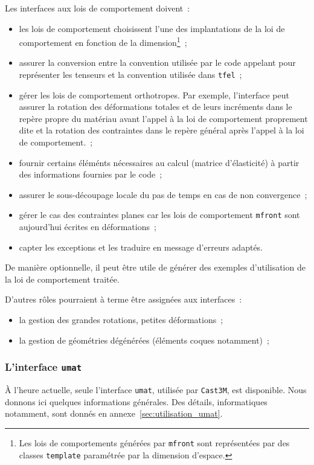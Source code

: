 \documentclass[rectoverso,pleiades,pstricks,leqno,anti]{texmf/note_technique_2010}
\newcommand{\TFEL}{\texttt{tfel}}
\newcommand{\mfront}{\texttt{mfront}}
\newcommand{\castem}{\texttt{Cast3M}}
\def\ifmonospace{\ifdim\fontdimen3\font=0pt }
\def\cpp{%
\ifmonospace%
    C++%
\else%
    C\kern-.1667em\raise.30ex\hbox{\smaller{++}}%
\fi%
\spacefactor1000 }
\begin{document}
Les interfaces aux lois de comportement doivent~:
\begin{itemize}
  \item les lois de comportement choisissent l'une des implantations de
  la loi de comportement en fonction de la dimension\footnote{Les lois
    de comportements générées par \mfront{} sont représentées par des
    classes \texttt{template} paramétrée par la dimension d'espace.}~;
  \item assurer la conversion entre la convention utilisée par le code
  appelant pour représenter les tenseurs et la convention utilisée dans
  \TFEL{}~;
  \item gérer les lois de comportement orthotropes. Par exemple,
  l'interface peut assurer la rotation des déformations totales et de
  leurs incréments dans le repère propre du matériau avant l'appel à la
  loi de comportement proprement dite et la rotation des contraintes
  dans le repère général après l'appel à la loi de comportement.~;
  \item fournir certains éléménts nécessaires au calcul (matrice
  d'élasticité) à partir des informations fournies par le code~;
  \item assurer le sous-découpage locale du pas de temps en cas de non
  convergence~;
  \item gérer le cas des contraintes planes car les lois de comportement
  \mfront{} sont aujourd'hui écrites en déformations~;
  \item capter les exceptions \cpp{} et les traduire en message
  d'erreurs adaptés.
\end{itemize}

De manière optionnelle, il peut être utile de générer des exemples
d'utilisation de la loi de comportement traitée.

D'autres rôles pourraient à terme être assignées aux interfaces~:
\begin{itemize}
\item la gestion des grandes rotations, petites déformations~;
\item la gestion de géométries dégénérées (éléments coques notamment)~;
\end{itemize}

\subsubsection{L'interface \texttt{umat}}

À l'heure actuelle, seule l'interface \texttt{umat}, utilisée par
\castem{}, est disponible. Nous donnons ici quelques informations
générales. Des détails, informatiques notamment, sont donnés en
annexe~\ref{sec:utilisation_umat}.
\end{document}
